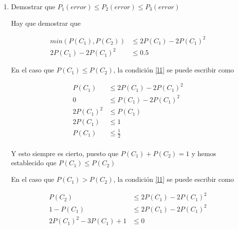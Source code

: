 \documentclass[a4paper]{article}
\begin{document}
\begin{enumerate}
{\begin{itemize}
    \end{itemize}

    }
    \item Demostrar que $P_1(error) \leq P_2(error) \leq P_3(error)$

    {\bfseries


    Hay que demostrar que

    \begin{align}
        min(P(C_1), P(C_2)) &\leq 2P(C_1) - 2P(C_1)^2 \label{l1} \\
        2P(C_1) - 2P(C_1)^2 &\leq 0.5 \label{l2}
    \end{align}

    En el caso que $P(C_1) \leq P(C_2)$, la condición \ref{l1} se puede escribir como

    \begin{align*}
        P(C_1) &\leq 2P(C_1) - 2P(C_1)^2 \\
        0 &\leq P(C_1) - 2P(C_1)^2 \\
        2P(C_1)^2 &\leq P(C_1) \\
        2P(C_1) &\leq 1 \\
        P(C_1) &\leq \frac{1}{2} \\
    \end{align*}

    Y esto siempre es cierto, puesto que $P(C_1) + P(C_2) = 1$ y hemos establecido que $P(C_1) \leq P(C_2)$

    En el caso que $P(C_1) > P(C_2)$, la condición \ref{l1} se puede escribir como

    \begin{align*}
        P(C_2) &\leq 2P(C_1) - 2P(C_1)^2 \\
        1 - P(C_1) &\leq 2P(C_1) - 2P(C_1)^2 \\
        2P(C_1)^2- 3P(C_1) +1 &\leq 0 \\
    \end{align*}

}
\end{enumerate}
\end{document}
